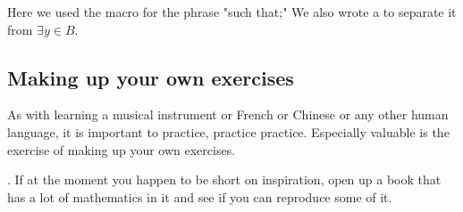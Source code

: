Here we used the  macro for the phrase  "such that;"   We also wrote a  to separate it from $\exists y \in B$.



\subsection{Making up your own exercises}

As with learning a musical instrument or French or Chinese or any other human language, it is important to practice, practice practice.  Especially valuable is the exercise of making up your own exercises.   

.  If at the moment you happen to be short on inspiration, open up a book that has a lot of mathematics in it and see if you can reproduce some of it.

